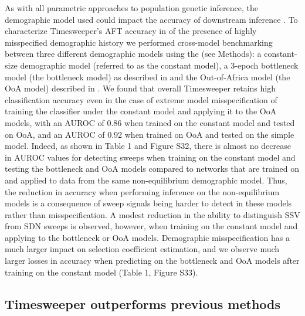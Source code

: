 As with all parametric approaches to population genetic inference, the demographic model used could impact the accuracy of downstream inference \cite{johriProspectAchievingAccurate2022,johriRecommendationsImprovingStatistical2022}. To characterize Timesweeper’s AFT accuracy in of the presence of highly misspecified demographic history we performed cross-model benchmarking between three different demographic models using the (see Methods): a constant-size demographic model (referred to as the constant model), a 3-epoch bottleneck model (the bottleneck model) as described in \cite{marthAlleleFrequencySpectrum2004} and the Out-of-Africa model (the OoA model) described in \cite{gutenkunstInferringJointDemographic2009}.
We found that overall Timesweeper retains high classification accuracy even in the case of extreme model misspecification of training the classifier under the constant model and applying it to the OoA models, with an AUROC of 0.86 when trained on the constant model and tested on OoA, and an AUROC of 0.92 when trained on OoA and tested on the simple model. Indeed, as shown in Table 1 and Figure S32, there is almost no decrease in AUROC values for detecting sweeps when training on the constant model and testing the bottleneck and OoA models compared to networks that are trained on and applied to data from the same non-equilibrium demographic model. Thus, the reduction in accuracy when performing inference on the non-equilibrium models is a consequence of sweep signals being harder to detect in these models rather than misspecification. A modest reduction in the ability to distinguish SSV from SDN sweeps is observed, however, when training on the constant model and applying to the bottleneck or OoA models. Demographic misspecification has a much larger impact on selection coefficient estimation, and we observe much larger losses in accuracy when predicting on the bottleneck and OoA models after training on the constant model (Table 1, Figure S33). \\
 

\subsection{Timesweeper outperforms previous methods}

